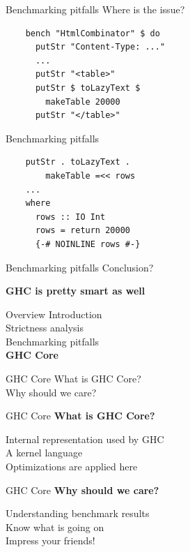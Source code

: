 \documentclass[20pt]{beamer}
\newcommand{\vspaced}{
    \vspace{5mm}
}
\begin{document}
\begin{frame}[fragile]{Benchmarking pitfalls}
    Where is the issue? \\
    \vspaced
    \begin{lstlisting}
    bench "HtmlCombinator" $ do
      putStr "Content-Type: ..."
      ...
      putStr "<table>"
      putStr $ toLazyText $
        makeTable 20000
      putStr "</table>"
    \end{lstlisting}
\end{frame}

\begin{frame}[fragile]{Benchmarking pitfalls}
    \begin{lstlisting}
    putStr . toLazyText .
        makeTable =<< rows
    ...
    where
      rows :: IO Int
      rows = return 20000
      {-# NOINLINE rows #-}
    \end{lstlisting}
\end{frame}

\begin{frame}{Benchmarking pitfalls}
    Conclusion? \\
    \vspaced
    \textbf{GHC is pretty smart as well}
\end{frame}


\begin{frame}{Overview}
    Introduction \\
    Strictness analysis \\
    Benchmarking pitfalls \\
    \textbf{GHC Core} \\
\end{frame}

\begin{frame}{GHC Core}
    What is GHC Core? \\
    Why should we care?
\end{frame}

\begin{frame}{GHC Core}
    \textbf{What is GHC Core?} \\
    \vspaced
    Internal representation used by GHC \\
    A kernel language \\
    Optimizations are applied here
\end{frame}

\begin{frame}{GHC Core}
    \textbf{Why should we care?} \\
    \vspaced
    Understanding benchmark results \\
    Know what is going on \\
    Impress your friends!
\end{frame}
\end{document}
